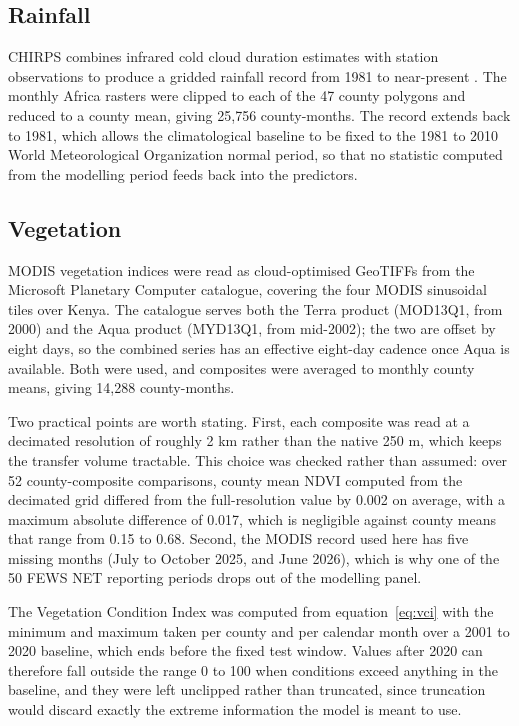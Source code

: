 \documentclass[11pt]{article}
\begin{document}
\subsection{Rainfall}

CHIRPS combines infrared cold cloud duration estimates with station observations
to produce a gridded rainfall record from 1981 to near-present \cite{funk2015}.
The monthly Africa rasters were clipped to each of the 47 county polygons and
reduced to a county mean, giving 25,756 county-months. The record extends back
to 1981, which allows the climatological baseline to be fixed to the 1981 to
2010 World Meteorological Organization normal period, so that no statistic
computed from the modelling period feeds back into the predictors.

\subsection{Vegetation}

MODIS vegetation indices were read as cloud-optimised GeoTIFFs from the
Microsoft Planetary Computer catalogue, covering the four MODIS sinusoidal tiles
over Kenya. The catalogue serves both the Terra product (MOD13Q1, from 2000) and
the Aqua product (MYD13Q1, from mid-2002); the two are offset by eight days, so
the combined series has an effective eight-day cadence once Aqua is available.
Both were used, and composites were averaged to monthly county means, giving
14,288 county-months.

Two practical points are worth stating. First, each composite was read at a
decimated resolution of roughly 2 km rather than the native 250 m, which keeps
the transfer volume tractable. This choice was checked rather than assumed: over
52 county-composite comparisons, county mean NDVI computed from the decimated
grid differed from the full-resolution value by 0.002 on average, with a maximum
absolute difference of 0.017, which is negligible against county means that range
from 0.15 to 0.68. Second, the MODIS record used here has five missing months
(July to October 2025, and June 2026), which is why one of the 50 FEWS NET
reporting periods drops out of the modelling panel.

The Vegetation Condition Index was computed from equation~\eqref{eq:vci} with the
minimum and maximum taken per county and per calendar month over a 2001 to 2020
baseline, which ends before the fixed test window. Values after 2020 can
therefore fall outside the range 0 to 100 when conditions exceed anything in the
baseline, and they were left unclipped rather than truncated, since truncation
would discard exactly the extreme information the model is meant to use.
\end{document}
